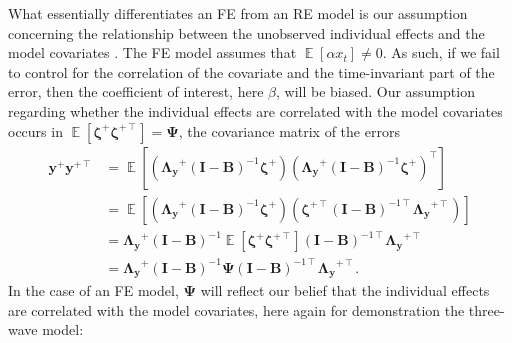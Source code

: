 \documentclass[]{interact}
\theoremstyle{plain}%
\theoremstyle{definition}
\theoremstyle{remark}
\begin{document}
What essentially differentiates an FE from an RE model is our assumption
concerning the relationship between the unobserved individual effects
and the model covariates \citep{Bollen2010}. The FE model assumes that
\(\mathop{\mathrm{\mathbb{E}}}[\alpha x_{t}] \ne 0\). As such, if we
fail to control for the correlation of the covariate and the
time-invariant part of the error, then the coefficient of interest, here
\(\beta\), will be biased. Our assumption regarding whether the
individual effects are correlated with the model covariates occurs in
\(\mathop{\mathrm{\mathbb{E}}}[\bm{\zeta}^{+}\bm{\zeta}^{+ \intercal}] = \bm{\Psi}\),
the covariance matrix of the errors \begin{align}
\bm{y}^{+}\bm{y}^{+ \intercal} & = \mathop{\mathrm{\mathbb{E}}}[(\bm{\Lambda_{y}}^{+}(\bm{I} - \bm{B})^{-1}\bm{\zeta}^{+})(\bm{\Lambda_{y}}^{+}(\bm{I} - \bm{B})^{-1}\bm{\zeta}^{+})^{\intercal}] \\
 & = \mathop{\mathrm{\mathbb{E}}}[(\bm{\Lambda_{y}}^{+}(\bm{I} - \bm{B})^{-1}\bm{\zeta}^{+})(\bm{\zeta}^{+ \intercal}(\bm{I} - \bm{B})^{-1 \intercal}\bm{\Lambda_{y}}^{+ \intercal})] \\
 & = \bm{\Lambda_{y}}^{+}(\bm{I} - \bm{B})^{-1} \mathop{\mathrm{\mathbb{E}}}[\bm{\zeta}^{+}\bm{\zeta}^{+ \intercal}] (\bm{I} - \bm{B})^{-1 \intercal}\bm{\Lambda_{y}}^{+ \intercal} \\
 & = \bm{\Lambda_{y}}^{+}(\bm{I} - \bm{B})^{-1} \bm{\Psi} (\bm{I} - \bm{B})^{-1 \intercal}\bm{\Lambda_{y}}^{+ \intercal}.
\end{align} In the case of an FE model, \(\bm{\Psi}\) will reflect our
belief that the individual effects are correlated with the model
covariates, here again for demonstration the three-wave model:
\end{document}
